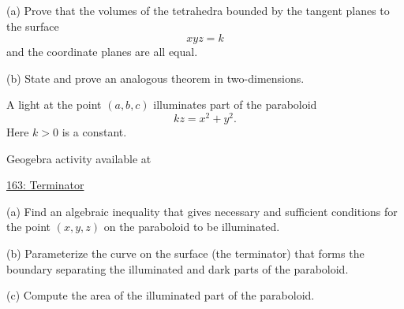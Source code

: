 \documentclass{ximera}
\begin{document}
\begin{question}  \label{Q435r4gt}
(a) Prove that the volumes of the tetrahedra bounded by the tangent planes to the surface
\[
    xyz = k
\]
and the coordinate planes are all equal.

(b) State and prove an analogous theorem in two-dimensions.
\end{question}


\begin{question}  \label{Qweregtt5}
A light at the point $(a,b,c)$ illuminates part of the paraboloid
\[
  k z = x^2 + y^2.
\]
Here $k>0$ is a constant.

 
\begin{onlineOnly}
    \begin{center}
\end{center}
\end{onlineOnly}

Geogebra activity available at

\href{https://www.geogebra.org/classic/nfkajvkp}{163: Terminator}



(a) Find an algebraic inequality that gives necessary and sufficient conditions for the point $(x,y,z)$ on the paraboloid to be illuminated.

(b) Parameterize the curve on the surface (the terminator) that forms the boundary separating the illuminated and dark parts of the paraboloid. 

(c) Compute the area of the illuminated part of the paraboloid.
\end{question}
\end{document}
